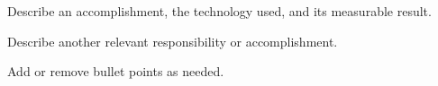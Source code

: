 
\vspace{1.0mm}
\resumeItemListStart
    \item{Describe an accomplishment, the technology used, and its measurable result.}
    \item{Describe another relevant responsibility or accomplishment.}
    \item{Add or remove bullet points as needed.}
\resumeItemListEnd
